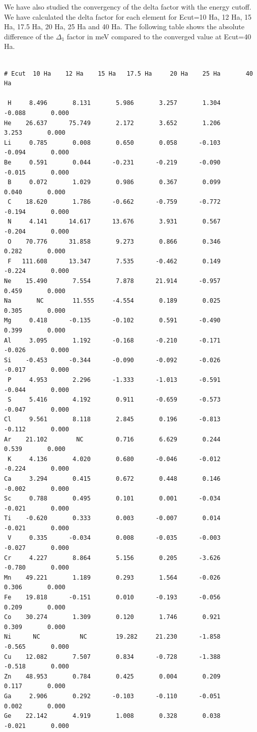 \documentclass[10pt]{revtex4}
\begin{document}
We have also studied the convergency of the delta factor with the energy cutoff. We have calculated the delta factor for each element for Ecut=10 Ha, 12 Ha, 15 Ha, 17.5 Ha, 20 Ha, 25 Ha and 40 Ha. The following table shows the absolute difference of the $\Delta_1$ factor in meV compared to the converged value at Ecut=40 Ha.
\begin{verbatim}

# Ecut	10 Ha    12 Ha	  15 Ha	  17.5 Ha	  20 Ha	   25 Ha	   40 Ha 

 H	   8.496	   8.131	   5.986	   3.257	   1.304	  -0.088	   0.000
He	  26.637	  75.749	   2.172	   3.652	   1.206	   3.253	   0.000
Li	   0.785	   0.008	   0.650	   0.058	  -0.103	  -0.094	   0.000
Be	   0.591	   0.044	  -0.231	  -0.219	  -0.090	  -0.015	   0.000
 B	   0.072	   1.029	   0.986	   0.367	   0.099	   0.040	   0.000
 C	  18.620	   1.786	  -0.662	  -0.759	  -0.772	  -0.194	   0.000
 N	   4.141	  14.617	  13.676	   3.931	   0.567	  -0.204	   0.000
 O	  70.776	  31.858	   9.273	   0.866	   0.346	   0.282	   0.000
 F	 111.608	  13.347	   7.535	  -0.462	   0.149	  -0.224	   0.000
Ne	  15.490	   7.554	   7.878	  21.914	  -0.957	   0.459	   0.000
Na	     NC		   11.555	  -4.554	   0.189	   0.025	   0.305	   0.000
Mg	   0.418	  -0.135	  -0.102	   0.591	  -0.490	   0.399	   0.000
Al	   3.095	   1.192	  -0.168	  -0.210	  -0.171	  -0.026	   0.000
Si	  -0.453	  -0.344	  -0.090	  -0.092	  -0.026	  -0.017	   0.000
 P	   4.953	   2.296	  -1.333	  -1.013	  -0.591	  -0.044	   0.000
 S	   5.416	   4.192	   0.911	  -0.659	  -0.573	  -0.047	   0.000
Cl	   9.561	   8.118	   2.845	   0.196	  -0.813	  -0.112	   0.000
Ar	  21.102	    NC	 	   0.716	   6.629	   0.244	   0.539	   0.000
 K	   4.136	   4.020	   0.680	  -0.046	  -0.012	  -0.224	   0.000
Ca	   3.294	   0.415	   0.672	   0.448	   0.146	  -0.002	   0.000
Sc	   0.788	   0.495	   0.101	   0.001	  -0.034	  -0.021	   0.000
Ti	  -0.620	   0.333	   0.003	  -0.007	   0.014	  -0.021	   0.000
 V	   0.335	  -0.034	   0.008	  -0.035	  -0.003	  -0.027	   0.000
Cr	   4.227	   8.864	   5.156	   0.205	  -3.626	  -0.780	   0.000
Mn	  49.221	   1.189	   0.293	   1.564	  -0.026	   0.306	   0.000
Fe	  19.818	  -0.151	   0.010	  -0.193	  -0.056	   0.209	   0.000
Co	  30.274	   1.309	   0.120	   1.746	   0.921	   0.309	   0.000
Ni	    NC  	     NC		   19.282	  21.230	  -1.858	  -0.565	   0.000
Cu	  12.082	   7.507	   0.834	  -0.728	  -1.388	  -0.518	   0.000
Zn	  48.953	   0.784	   0.425	   0.004	   0.209	   0.117	   0.000
Ga	   2.906	   0.292	  -0.103	  -0.110	  -0.051	   0.002	   0.000
Ge	  22.142	   4.919	   1.008	   0.328	   0.038	  -0.021	   0.000

\end{verbatim}
\end{document}
